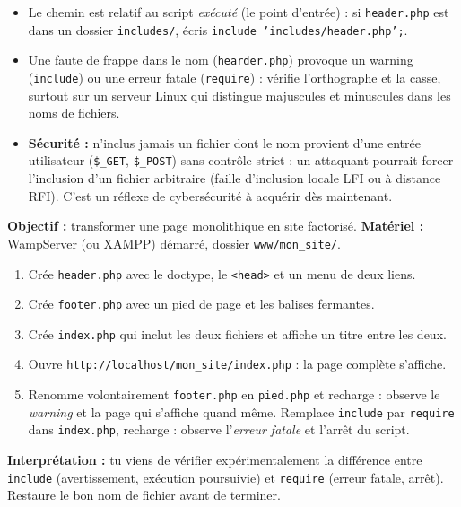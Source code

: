 \documentclass[11pt]{article}
\begin{document}
\begin{attention}
\begin{itemize}
\item Le chemin est relatif au script \emph{exécuté} (le point d'entrée) : si \texttt{header.php} est dans un dossier \texttt{includes/}, écris \texttt{include 'includes/header.php';}.
\item Une faute de frappe dans le nom (\texttt{hearder.php}) provoque un warning (\texttt{include}) ou une erreur fatale (\texttt{require}) : vérifie l'orthographe et la casse, surtout sur un serveur Linux qui distingue majuscules et minuscules dans les noms de fichiers.
\item \textbf{Sécurité :} n'inclus jamais un fichier dont le nom provient d'une entrée utilisateur (\texttt{\$\_GET}, \texttt{\$\_POST}) sans contrôle strict : un attaquant pourrait forcer l'inclusion d'un fichier arbitraire (faille d'inclusion locale LFI ou à distance RFI). C'est un réflexe de cybersécurité à acquérir dès maintenant.
\end{itemize}
\end{attention}

\begin{experience}
\textbf{Objectif :} transformer une page monolithique en site factorisé. \textbf{Matériel :} WampServer (ou XAMPP) démarré, dossier \texttt{www/mon\_site/}.
\begin{enumerate}
\item Crée \texttt{header.php} avec le doctype, le \texttt{<head>} et un menu de deux liens.
\item Crée \texttt{footer.php} avec un pied de page et les balises fermantes.
\item Crée \texttt{index.php} qui inclut les deux fichiers et affiche un titre entre les deux.
\item Ouvre \texttt{http://localhost/mon\_site/index.php} : la page complète s'affiche.
\item Renomme volontairement \texttt{footer.php} en \texttt{pied.php} et recharge : observe le \emph{warning} et la page qui s'affiche quand même. Remplace \texttt{include} par \texttt{require} dans \texttt{index.php}, recharge : observe l'\emph{erreur fatale} et l'arrêt du script.
\end{enumerate}
\textbf{Interprétation :} tu viens de vérifier expérimentalement la différence entre \texttt{include} (avertissement, exécution poursuivie) et \texttt{require} (erreur fatale, arrêt). Restaure le bon nom de fichier avant de terminer.
\end{experience}
\end{document}

